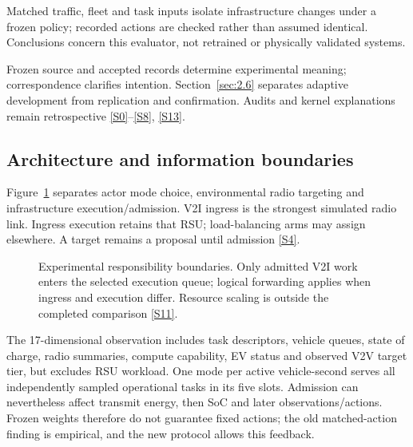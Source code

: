 \documentclass[11pt,a4paper]{article}
\begin{document}
Matched traffic, fleet and task inputs isolate infrastructure changes under a frozen policy; recorded actions are checked rather than assumed identical. Conclusions concern this evaluator, not retrained or physically validated systems.

Frozen source and accepted records determine experimental meaning; correspondence clarifies intention. Section~\ref{sec:2.6} separates adaptive development from replication and confirmation. Audits and kernel explanations remain retrospective \hyperref[source-s0]{[S0]}--\hyperref[source-s8]{[S8]}, \hyperref[source-s13]{[S13]}.

\subsection{Architecture and information boundaries}\label{sec:2.2}

Figure~\ref{fig:1} separates actor mode choice, environmental radio targeting and infrastructure execution/admission. V2I ingress is the strongest simulated radio link. Ingress execution retains that RSU; load-balancing arms may assign elsewhere. A target remains a proposal until admission \hyperref[source-s4]{[S4]}.

\begin{figure}[htbp]
\centering

\caption{Experimental responsibility boundaries. Only admitted V2I work enters the selected execution queue; logical forwarding applies when ingress and execution differ. Resource scaling is outside the completed comparison \hyperref[source-s11]{[S11]}.}\label{fig:1}
\end{figure}

The 17-dimensional observation includes task descriptors, vehicle queues, state of charge, radio summaries, compute capability, EV status and observed V2V target tier, but excludes RSU workload. One mode per active vehicle-second serves all independently sampled operational tasks in its five slots. Admission can nevertheless affect transmit energy, then SoC and later observations/actions. Frozen weights therefore do not guarantee fixed actions; the old matched-action finding is empirical, and the new protocol allows this feedback.
\end{document}
